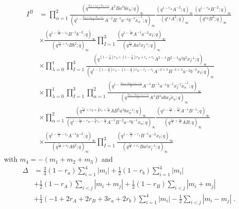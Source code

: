 \documentclass[12pt]{article}
\numberwithin{equation}{section}
\begin{document}
\begin{align}
I^B&=
\prod_{\alpha=1}^2
\frac{
(q^{\frac{2r_A+r_B+3r_a+r_b}{2}} A^2Ba^3b\tilde{x}_{\alpha};q)_{\infty}
}
{
(q^{1-\frac{2r_A+r_B+3r_a+r_b}{2}} A^{-2}B^{-1}a^{-3}b^{-1}\tilde{x}_{\alpha}^{-1};q)_{\infty}
}
\frac{
(q^{1-r_A}A^{-2};q)_{\infty}
}
{
(q^{r_A}A^2;q)_{\infty}
}
\frac{
(q^{1-r_B}B^{-2};q)_{\infty}
}
{
(q^{r_B}B^2;q)_{\infty}
}
\nonumber\\
&\times 
\frac{
(q^{1-\frac{r_B}{2}-r_b}B^{-1}b^{-2};q)_{\infty}
}
{
(q^{\frac{r_B}{2}+r_b}Bb^{2};q)_{\infty}
}
\prod_{I=1}^3
\frac{
(q^{1-\frac{r_A}{2}}A^{-1}a^{-2}x_I;q)_{\infty}
}
{
(q^{\frac{r_A}{2}}Aa^2x_I^{-1};q)_{\infty}
}
\nonumber\\
&\times 
\prod_{\lambda=0}^1
\prod_{I=1}^3
\frac{
(q^{(1-\frac{\lambda}{2})r_A+(1-\frac{\lambda}{2})r_B+r_a+r_b} A^{2-\lambda} B^{2-\lambda} a^2 b^2x_I^{-1};q)_{\infty}
}
{
(q^{1-(1-\frac{\lambda}{2})r_A-(1-\frac{\lambda}{2})r_B-r_a-r_b} A^{-2+\lambda} B^{-2+\lambda} a^{-2} b^{-2}x_I;q)_{\infty}
}
\nonumber\\
&\times 
\prod_{\lambda=0}^1
\prod_{I=1}^3
\prod_{\alpha=1}^2
\frac{
(q^{1-\frac{\lambda r_A+\lambda r_B+r_a+r_b}{2}} A^{-\lambda} B^{-\lambda} a^{-1} b^{-1}x_I^{-1}\tilde{x}_{\alpha}^{-1};q)_{\infty}
}
{
(q^{\frac{\lambda r_A+\lambda r_B+r_a+r_b}{2}} A^{\lambda} B^{\lambda} a bx_I\tilde{x}_{\alpha};q)_{\infty}
}
\nonumber\\
&\times 
\prod_{\alpha=1}^2
\frac{
(q^{\frac{r_A}{2}+r_B+\frac32 r_a+\frac{r_b}{2}} AB^2a^3bx_{\alpha}^{-1};q)_{\infty}
}
{
(q^{1-\frac{r_A}{2}-r_B-\frac32 r_a-\frac{r_b}{2}} A^{-1}B^{-2}a^{-3}b^{-1}x_{\alpha};q)_{\infty}
}
\frac{
(q^{1-\frac{r_A}{2}-\frac{r_B}{2}} A^{-1}B^{-1};q)_{\infty}
}
{
(q^{\frac{r_A}{2}+\frac{r_B}{2}} AB;q)_{\infty}
}
\nonumber\\
&\times 
\frac{
(q^{1-\frac{r_A}{2}-r_b} A^{-1}b^{-2};q)_{\infty}
}
{
(q^{\frac{r_A}{2}+r_b} Ab^2;q)_{\infty}
}
\prod_{I=1}^3
\frac{
(q^{1-\frac{r_B}{2}-r_a} B^{-1}a^{-2}x_I;q)_{\infty}
}
{
(q^{\frac{r_B}{2}+r_a} Ba^2x_I^{-1};q)_{\infty}
}
\end{align}
with $m_4 = - (m_1 + m_2 + m_3)$ and
\begin{align}
\Delta&=
\frac34 (1-r_a)\sum_{i=1}^4 |m_i|
+\frac12(1-r_b)\sum_{i=1}^4|m_i|
\nonumber\\
&
+\frac12 (1-r_A)\sum_{i<j}|m_i+m_j|
+\frac12 (1-r_B)\sum_{i<j}|m_i+m_j|
\nonumber\\
&+\frac14(-1+2r_A+2r_B+3r_a+2r_b)\sum_{i=1}^4|m_i|
-\frac12 \sum_{i<j}|m_i-m_j| \; .
\end{align} 
\end{document}
